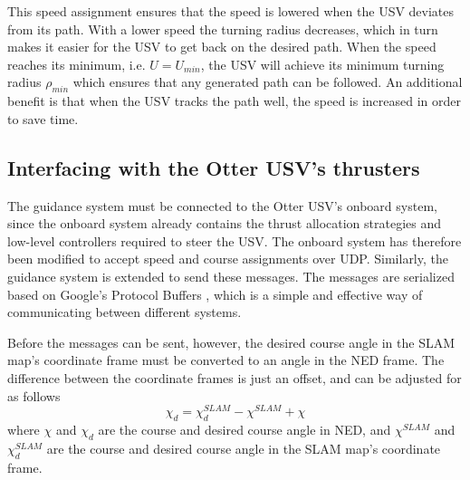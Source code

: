 This speed assignment ensures that the speed is lowered when the USV deviates from its path. With a lower speed the turning radius decreases, which in turn makes it easier for the USV to get back on the desired path. When the speed reaches its minimum, i.e. $U = U_{min}$, the USV will achieve its minimum turning radius $\rho_{min}$ which ensures that any generated path can be followed. An additional benefit is that when the USV tracks the path well, the speed is increased in order to save time.

\subsection{Interfacing with the Otter USV's thrusters}

The guidance system must be connected to the Otter USV's onboard system, since the onboard system already contains the thrust allocation strategies and low-level controllers required to steer the USV. The onboard system has therefore been modified to accept speed and course assignments over UDP. Similarly, the guidance system is extended to send these messages. The messages are serialized based on Google's Protocol Buffers \citep{wiki:protobuf}, which is a simple and effective way of communicating between different systems.

Before the messages can be sent, however, the desired course angle in the SLAM map's coordinate frame must be converted to an angle in the NED frame. The difference between the coordinate frames is just an offset, and can be adjusted for as follows
\begin{equation}
\chi_d = \chi_d^{SLAM} - \chi^{SLAM} + \chi 
\end{equation}
where $\chi$ and $\chi_d$ are the course and desired course angle in NED, and $\chi^{SLAM}$ and $\chi_d^{SLAM}$ are the course and desired course angle in the SLAM map's coordinate frame.
